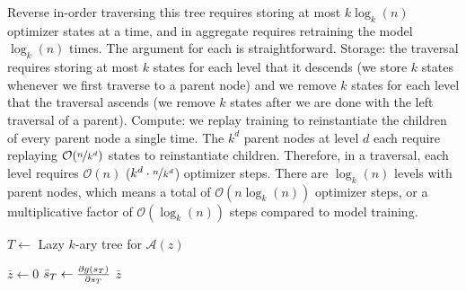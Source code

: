 Reverse in-order traversing this tree requires storing at most $k\log_k(n)$
optimizer states at a time, and in aggregate requires retraining the model
$\log_k(n)$ times. The argument for each is straightforward. Storage: the
traversal requires storing at most $k$ states for each level that it descends
(we store $k$ states whenever we first traverse to a parent node) and we remove
$k$ states for each level that the traversal ascends (we remove $k$ states after
we are done with the left traversal of a parent). Compute: we replay training to
reinstantiate the children of every parent node a single time. The $k^d$ parent
nodes at level $d$ each require replaying $\mathcal{O}(\nicefrac{n}{k^d})$
states to reinstantiate children. Therefore, in a traversal, each level requires
$\mathcal{O}(n)$ ($k^d \cdot \nicefrac{n}{k^d}$) optimizer steps. There are
$\log_k(n)$ levels with parent nodes, which means a total of $\mathcal{O}(n
\log_k(n))$ optimizer steps, or a multiplicative factor of
$\mathcal{O}(\log_k(n))$ steps compared to model training.

\begin{algorithm}
  \DontPrintSemicolon $T \gets $ Lazy $k$-ary tree for $\mathcal{A}(z)$ \qquad {} \;

  \hspace{0pt} 
  $\bar{z} \gets 0$ \;
  $\bar{s}_T \gets \smash{\frac{\partial g(s_T)}{\partial s_T}}$ \qquad {} %
  \;
  \hspace{0pt} 
  \;
  \Return $\bar{z}$ \;
  \caption{\textsc{Replay}. metagradients in
  $\mathcal{O}(k\log_k(T))$ space.}
  \label{alg:replay}
\end{algorithm}

